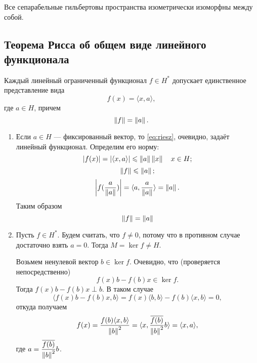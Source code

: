 \begin{corollaryth}
    \indent Все сепарабельные гильбертовы пространства изометрически изоморфны между собой.
\end{corollaryth}

\subsection[Теорема Рисса]{Теорема Рисса об общем виде линейного функционала}
\begin{theorem}
    Каждый линейный ограниченный функционал $f \in H^*$ допускает единственное 
    представление вида
    \begin{equation}\label{eq:riesz}
        f(x) = \langle x, a \rangle,
    \end{equation}
    где $a \in H$, причем
    \[ \left\|f\right\| = \left\|a\right\|. \]
\end{theorem}

\begin{proofbreak}
\begin{enumerate}
    \item Если $a \in H$ --- фиксированный вектор, то \eqref{eq:riesz}, очевидно, задаёт линейный
        функционал. Определим его норму:
            \[ \left|f(x)\right| = \left|\langle x, a \rangle\right| \leqslant \left\|a\right\|\left\|x\right\| \quad x \in H; \]
            \[ \left\|f\right\| \leqslant \left\|a\right\|; \]
            \[ \left|f(\frac{a}{\left\|a\right\|})\right| = \langle a, \frac{a}{\left\|a\right\|} \rangle = \left\|a\right\|. \]
        Таким образом
        \[ \left\|f\right\| = \left\|a\right\| \]
    \item Пусть $f \in H^*$. Будем считать, что $f \neq 0$, потому что в противном случае
        достаточно взять $a = 0$. Тогда $M = \ker f \neq H$.

        Возьмем ненулевой вектор $b \in \ker f$. Очевидно, что (проверяется непосредственно)
        \[ f(x)b - f(b)x \in \ker f. \]
        Тогда $f(x)b - f(b)x \perp b$. В таком случае
        \[ \langle f(x)b - f(b) x, b \rangle = f(x) \langle b, b \rangle - 
            f(b) \langle x, b \rangle = 0, \]
        откуда получаем
        \[ f(x) = \frac{f(b)\langle x, b \rangle}{\left\|b\right\|^2} 
            = \langle x, \frac{\overline{f(b)}}{\left\|b\right\|^2}b \rangle = \langle x, a \rangle, \]
        где $a = \displaystyle\frac{\overline{f(b)}}{\left\|b\right\|^2}b$.
\end{enumerate}
\end{proofbreak}
